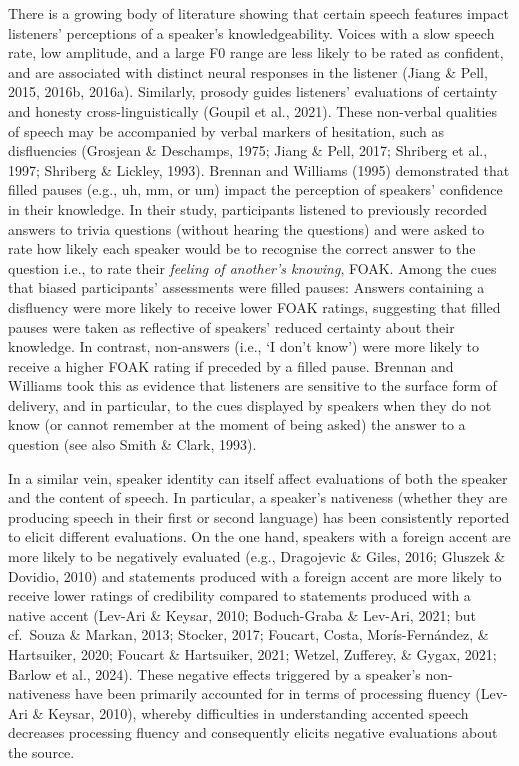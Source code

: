 \documentclass[
  man,floatsintext]{apa7}
\begin{document}
There is a growing body of literature showing that certain speech features impact listeners' perceptions of a speaker's knowledgeability. Voices with a slow speech rate, low amplitude, and a large F0 range are less likely to be rated as confident, and are associated with distinct neural responses in the listener (Jiang \& Pell, 2015, 2016b, 2016a). Similarly, prosody guides listeners' evaluations of certainty and honesty cross-linguistically (Goupil et al., 2021). These non-verbal qualities of speech may be accompanied by verbal markers of hesitation, such as disfluencies (Grosjean \& Deschamps, 1975; Jiang \& Pell, 2017; Shriberg et al., 1997; Shriberg \& Lickley, 1993). Brennan and Williams (1995) demonstrated that filled pauses (e.g., uh, mm, or um) impact the perception of speakers' confidence in their knowledge. In their study, participants listened to previously recorded answers to trivia questions (without hearing the questions) and were asked to rate how likely each speaker would be to recognise the correct answer to the question i.e., to rate their \emph{feeling of another's knowing}, FOAK. Among the cues that biased participants' assessments were filled pauses: Answers containing a disfluency were more likely to receive lower FOAK ratings, suggesting that filled pauses were taken as reflective of speakers' reduced certainty about their knowledge. In contrast, non-answers (i.e., `I don't know') were more likely to receive a higher FOAK rating if preceded by a filled pause. Brennan and Williams took this as evidence that listeners are sensitive to the surface form of delivery, and in particular, to the cues displayed by speakers when they do not know (or cannot remember at the moment of being asked) the answer to a question (see also Smith \& Clark, 1993).

In a similar vein, speaker identity can itself affect evaluations of both the speaker and the content of speech. In particular, a speaker's nativeness (whether they are producing speech in their first or second language) has been consistently reported to elicit different evaluations. On the one hand, speakers with a foreign accent are more likely to be negatively evaluated (e.g., Dragojevic \& Giles, 2016; Gluszek \& Dovidio, 2010) and statements produced with a foreign accent are more likely to receive lower ratings of credibility compared to statements produced with a native accent (Lev-Ari \& Keysar, 2010; Boduch-Graba \& Lev-Ari, 2021; but cf.~Souza \& Markan, 2013; Stocker, 2017; Foucart, Costa, Morís-Fernández, \& Hartsuiker, 2020; Foucart \& Hartsuiker, 2021; Wetzel, Zufferey, \& Gygax, 2021; Barlow et al., 2024). These negative effects triggered by a speaker's non-nativeness have been primarily accounted for in terms of processing fluency (Lev-Ari \& Keysar, 2010), whereby difficulties in understanding accented speech decreases processing fluency and consequently elicits negative evaluations about the source.
\end{document}
